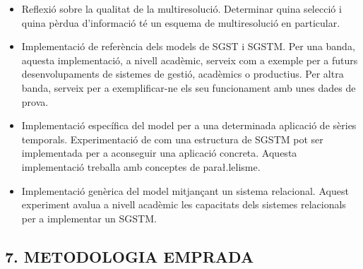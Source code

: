 \documentclass{scrartcl}
\begin{document}
\begin{itemize}
    

\item Reflexió sobre la qualitat de la multiresolució. Determinar
  quina selecció i quina pèrdua d'informació té un esquema de
  multiresolució en particular.



\item Implementació de referència dels models de SGST i SGSTM. Per una
  banda, aquesta implementació, a nivell acadèmic, serveix com a
  exemple per a futurs desenvolupaments de sistemes de gestió,
  acadèmics o productius. Per altra banda, serveix per a
  exemplificar-ne els seu funcionament amb unes dades de prova.

\item Implementació específica del model per a una determinada
  aplicació de sèries temporals. Experimentació de com una estructura
  de SGSTM pot ser implementada per a aconseguir una aplicació
  concreta. Aquesta implementació treballa amb conceptes de
  para\l.lelisme.

\item Implementació genèrica del model mitjançant un sistema
  relacional. Aquest experiment avalua a nivell acadèmic les capacitats dels sistemes relacionals per a implementar un SGSTM.




\end{itemize} 




\subsection*{7. METODOLOGIA EMPRADA}
\end{document}

